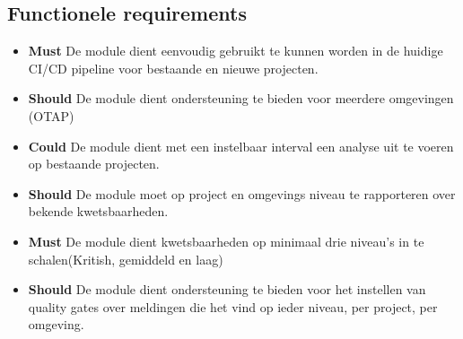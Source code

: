 \subsection{Functionele requirements}\label{subsec:functionele-requirements}
\begin{itemize}
    \item \textbf{Must} De module dient eenvoudig gebruikt te kunnen worden in de huidige CI/CD pipeline voor bestaande en nieuwe projecten.
    \item \textbf{Should} De module dient ondersteuning te bieden voor meerdere omgevingen (OTAP)
    \item \textbf{Could} De module dient met een instelbaar interval een analyse uit te voeren op bestaande projecten.
    \item \textbf{Should} De module moet op project en omgevings niveau te rapporteren over bekende kwetsbaarheden.
    \item \textbf{Must} De module dient kwetsbaarheden op minimaal drie niveau's in te schalen(Kritish, gemiddeld en laag)
    \item \textbf{Should} De module dient ondersteuning te bieden voor het instellen van quality gates over meldingen die het vind op ieder niveau, per project, per omgeving.
\end{itemize}

